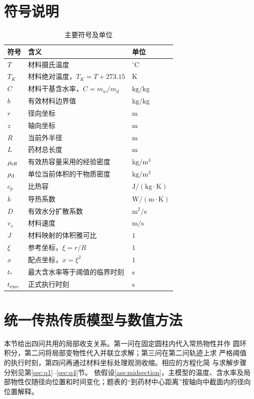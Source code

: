 \section{符号说明}
\begin{table}[H]
\centering\small
\caption{主要符号及单位}\label{tab:symbols}
\renewcommand{\arraystretch}{1.10}
\begin{tabularx}{\linewidth}{@{}lXl@{}}
\toprule 符号&含义&单位\\\midrule
$T$&材料摄氏温度&$^\circ\mathrm C$\\
$T_K$&材料绝对温度，$T_K=T+273.15$&$\mathrm K$\\
$C$&材料干基含水率，$C=m_w/m_d$&$\mathrm{kg/kg}$\\
$b$&有效材料边界值&$\mathrm{kg/kg}$\\
$r$&径向坐标&$\mathrm m$\\
$z$&轴向坐标&$\mathrm m$\\
$R$&当前外半径&$\mathrm m$\\
$L$&药材总长度&$\mathrm m$\\
$\rho_{\mathrm{eff}}$&有效热容量采用的经验密度&$\mathrm{kg/m^3}$\\
$\rho_{\mathrm d}$&单位当前体积的干物质密度&$\mathrm{kg/m^3}$\\
$c_p$&比热容&$\mathrm{J/(kg\cdot K)}$\\
$k$&导热系数&$\mathrm{W/(m\cdot K)}$\\
$D$&有效水分扩散系数&$\mathrm{m^2/s}$\\
$v_s$&材料速度&$\mathrm{m/s}$\\
$J$&材料映射的体积雅可比&$1$\\
$\xi$&参考坐标，$\xi=r/R$&$1$\\
$x$&配点坐标，$x=\xi^2$&$1$\\
$t_*$&最大含水率等于阈值的临界时刻&$\mathrm s$\\
$t_{\mathrm{exec}}$&正式执行时刻&$\mathrm s$\\
\bottomrule
\end{tabularx}
\end{table}

\section{统一传热传质模型与数值方法}
\label{sec:common-model}
本节给出四问共用的局部收支关系。第一问在固定圆柱内代入常热物性并作
圆环积分，第二问将局部变物性代入并联立求解；第三问在第二问轨迹上求
严格阈值的执行时刻，第四问再通过材料坐标处理观测收缩。相应的方程化简
与求解步骤分别见第\ref{sec:q1}--\ref{sec:q4}节。
依假设\ref{ass:midsection}，主模型的温度、含水率及局部物性仅随径向位置和时间变化；题表的“到药材中心距离”按轴向中截面内的径向位置解释。
